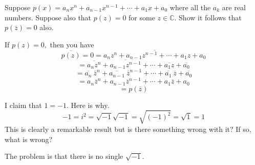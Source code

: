 \begin{enumialphparenastyle}
\begin{ex} \label{15julyprob2}Suppose $p\left( x\right)
=a_{n}x^{n}+a_{n-1}x^{n-1}+\cdots +a_{1}x+a_{0}$ where all the $a_{k}$ are
real numbers. Suppose also that $p\left( z\right) =0$ for some $z\in \mathbb{C}$. Show it follows that $p\left( \overline{z}\right) =0$ also. 
\begin{sol}
If $p\left( z\right) =0,$ then you have
\[
\overline{p\left( z\right) }=0=\overline{a_{n}z^{n}+a_{n-1}z^{n-1}+\cdots
+a_{1}z+a_{0}}
\]
\[
=\overline{a_{n}z^{n}}+\overline{a_{n-1}z^{n-1}}+\cdots +\overline{a_{1}z}+
\overline{a_{0}}
\]
\[
=\overline{a_{n}}\ \overline{z}^{n}+\overline{a_{n-1}}\ \overline{z}
^{n-1}+\cdots +\overline{a_{1}}\ \overline{z}+\overline{a_{0}}
\]
\[
=a_{n}\overline{z}^{n}+a_{n-1}\overline{z}^{n-1}+\cdots +a_{1}\overline{z}
+a_{0}
\]
\[
=p\left( \overline{z}\right)
\]
\end{sol}
\end{ex}

\begin{ex} I claim that $1=-1.$ Here is why.
\begin{equation*}
-1=i^{2}=\sqrt{-1}\sqrt{-1}=\sqrt{\left( -1\right) ^{2}}=\sqrt{1}=1
\end{equation*}
This is clearly a remarkable result but is there something wrong with it? If
so, what is wrong? 
\begin{sol}
The problem is that there is no single $\sqrt{-1}$.
\end{sol}
\end{ex}

\end{enumialphparenastyle}
